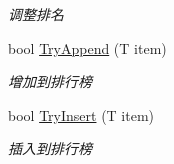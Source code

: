 \begin{DoxyCompactItemize}
\begin{DoxyCompactList}\small\item\em 调整排名 \end{DoxyCompactList}\item 
bool \mbox{\hyperlink{class_t_net_1_1_com_1_1_rank_1_1_ranking_a4737a6906c00419471c5bfa87cd3c4c0}{Try\+Append}} (T item)
\begin{DoxyCompactList}\small\item\em 增加到排行榜 \end{DoxyCompactList}\item 
bool \mbox{\hyperlink{class_t_net_1_1_com_1_1_rank_1_1_ranking_ab8bbf4eab0e0844151200e9e2414ab70}{Try\+Insert}} (T item)
\begin{DoxyCompactList}\small\item\em 插入到排行榜 \end{DoxyCompactList}\end{DoxyCompactItemize}
